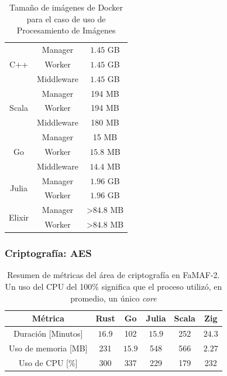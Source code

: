 \documentclass[11pt]{article}
\let\Oldsubsubsection\subsubsection
\renewcommand{\subsubsection}{\FloatBarrier\Oldsubsubsection}
\newcommand{\english}[1]{\textit{#1}}
\begin{document}
\begin{table}[H]
\centering
\begin{tabular}{|ccc|}
\hline
\multicolumn{1}{|c|}{\multirow{3}{*}{C++}} & \multicolumn{1}{c|}{Manager} & $1.45$ GB \\ \cline{2-3} 
\multicolumn{1}{|c|}{} & \multicolumn{1}{c|}{Worker} & $1.45$ GB \\ \cline{2-3} 
\multicolumn{1}{|c|}{} & \multicolumn{1}{c|}{Middleware} & $1.45$ GB \\ \hline
\multicolumn{1}{|c|}{\multirow{3}{*}{Scala}} & \multicolumn{1}{c|}{Manager} & 194 MB \\ \cline{2-3} 
\multicolumn{1}{|c|}{} & \multicolumn{1}{c|}{Worker} & 194 MB \\ \cline{2-3} 
\multicolumn{1}{|c|}{} & \multicolumn{1}{c|}{Middleware} & 180 MB \\ \hline
\multicolumn{1}{|c|}{\multirow{3}{*}{Go}} & \multicolumn{1}{c|}{Manager} & 15 MB \\ \cline{2-3} 
\multicolumn{1}{|c|}{} & \multicolumn{1}{c|}{Worker} & $15.8$ MB \\ \cline{2-3} 
\multicolumn{1}{|c|}{} & \multicolumn{1}{c|}{Middleware} & $14.4$ MB \\ \hline
\multicolumn{1}{|c|}{\multirow{2}{*}{Julia}} & \multicolumn{1}{c|}{Manager} & $1.96$ GB \\ \cline{2-3} 
\multicolumn{1}{|c|}{} & \multicolumn{1}{c|}{Worker} & $1.96$ GB \\ \hline
\multicolumn{1}{|c|}{\multirow{2}{*}{Elixir}} & \multicolumn{1}{c|}{Manager} & \textgreater{}$84.8$ MB \\ \cline{2-3} 
\multicolumn{1}{|c|}{} & \multicolumn{1}{c|}{Worker} & \textgreater{}$84.8$ MB \\ \hline
\end{tabular}
\caption{Tamaño de imágenes de Docker para el caso de uso de Procesamiento de Imágenes}
\label{tab:ip:image_sizes}
\end{table}

\subsubsection{Criptografía: AES} \label{sec:anex:metrics:aes}

\begin{table}[H]
\centering
\begin{tabular}{|c|c|c|c|c|c|}
\hline
Métrica & Rust & Go & Julia & Scala & Zig \\ \hline
Duración [Minutos] & $16.9$ & 102 & $15.9$ & 252 & $24.3$ \\ \hline
Uso de memoria [MB] & 231 & $15.9$ & 548 & 566 & $2.27$ \\ \hline
Uso de CPU [\%] & 300 & 337 & 229 & 179 & 232 \\ \hline
\end{tabular}
\caption{Resumen de métricas del área de criptografía en FaMAF-2. Un uso del CPU del 100\% significa que el proceso utilizó, en promedio, un único \english{core}}
\label{tab:aes:famaf_2}
\end{table}
\end{document}
